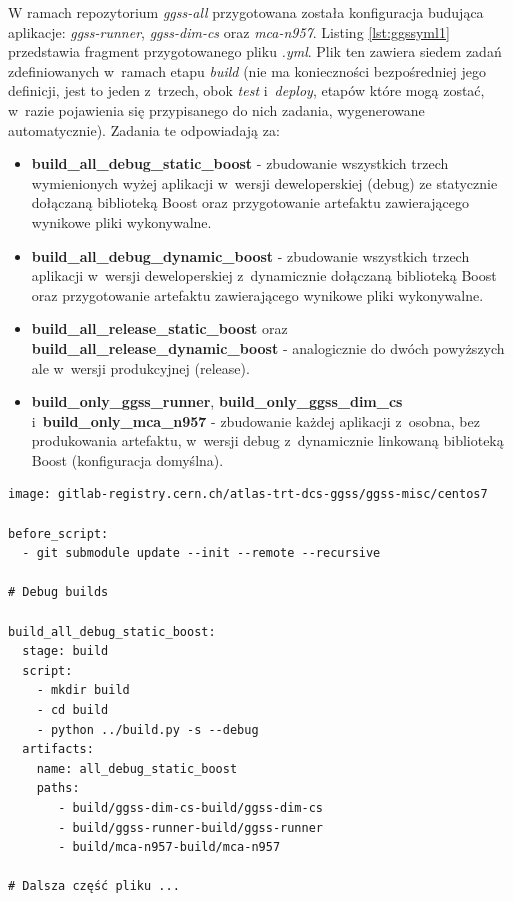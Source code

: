 W ramach repozytorium \textit{ggss-all} przygotowana została konfiguracja budująca aplikacje: \textit{ggss-runner}, \textit{ggss-dim-cs} oraz \textit{mca-n957}. Listing \ref{lst:ggssyml1} przedstawia fragment przygotowanego pliku \textit{.yml}. Plik ten zawiera siedem zadań zdefiniowanych w~ramach etapu \textit{build} (nie ma konieczności bezpośredniej jego definicji, jest to jeden z~trzech, obok \textit{test} i~\textit{deploy}, etapów które mogą zostać, w~razie pojawienia się przypisanego do nich zadania, wygenerowane automatycznie). Zadania te odpowiadają za:
\begin{itemize}
\item \textbf{build\_all\_debug\_static\_boost} - zbudowanie wszystkich trzech wymienionych wyżej aplikacji w~wersji deweloperskiej (debug) ze statycznie dołączaną biblioteką Boost oraz przygotowanie artefaktu zawierającego wynikowe pliki wykonywalne.
\item \textbf{build\_all\_debug\_dynamic\_boost} - zbudowanie wszystkich trzech aplikacji w~wersji deweloperskiej z~dynamicznie dołączaną biblioteką Boost oraz przygotowanie artefaktu zawierającego wynikowe pliki wykonywalne.
\item \textbf{build\_all\_release\_static\_boost} oraz \textbf{build\_all\_release\_dynamic\_boost} - analogicznie do dwóch powyższych ale w~wersji produkcyjnej (release).
\item \textbf{build\_only\_ggss\_runner}, \textbf{build\_only\_ggss\_dim\_cs} i~\textbf{build\_only\_mca\_n957} - zbudowanie każdej aplikacji z~osobna, bez produkowania artefaktu, w~wersji debug z~dynamicznie linkowaną biblioteką Boost (konfiguracja domyślna).
\end{itemize}

\begin{lstlisting}[caption={Fragment pliku \textit{.gitlab-ci.yml} konfigurującego \textit{pipeline} CI/CD dla repozytorium \textit{ggss-all}}, label={lst:ggssyml1}]
image: gitlab-registry.cern.ch/atlas-trt-dcs-ggss/ggss-misc/centos7

before_script:
  - git submodule update --init --remote --recursive

# Debug builds 

build_all_debug_static_boost:
  stage: build
  script:
    - mkdir build
    - cd build
    - python ../build.py -s --debug
  artifacts:
    name: all_debug_static_boost
    paths:
       - build/ggss-dim-cs-build/ggss-dim-cs
       - build/ggss-runner-build/ggss-runner
       - build/mca-n957-build/mca-n957

# Dalsza część pliku ...

\end{lstlisting}

